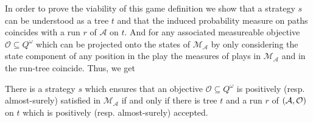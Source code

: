 In order to prove the viability of this game definition we show that a strategy
$s$ can be understood as a tree $t$ and that the induced probability measure on
paths coincides with a run $r$ of $\mathcal{A}$ on $t$. And for any associated
measureable objective $\mathcal{O}\subseteq Q^{\omega}$ which can be projected
onto the states of $\mathcal{M}_{\mathcal{A}}$ by only considering the state
component of any position in the play the measures of plays in
$\mathcal{M}_{\mathcal{A}}$ and in the run-tree coincide. Thus, we get
\begin{theorem}
  There is a strategy $s$ which ensures that an objective
  $\mathcal{O}\subseteq Q^{\omega}$ is positively (resp. almost-surely)
  satisfied in $\mathcal{M}_{\mathcal{A}}$ if and only if there is tree $t$ and
  a run $r$ of $\left(\mathcal{A},\mathcal{O}\right)$ on $t$ which is positively
  (resp. almost-surely) accepted.
  \label{thm:emptinessgame}
\end{theorem}
